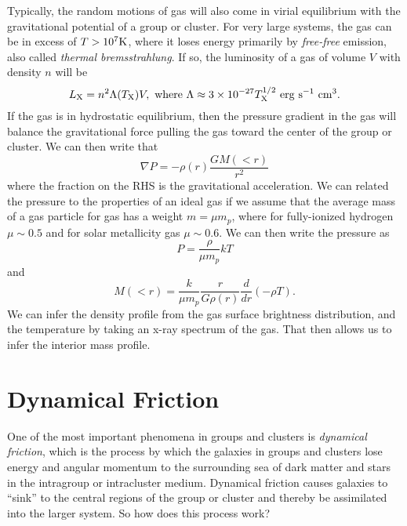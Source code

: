 \documentclass[]{article}
\begin{document}
Typically, the random motions of gas will also come in 
virial equilibrium with the gravitational potential of a
group or cluster.  For very large systems, the gas can be
in excess of $T>10^{7}\mathrm{K}$, where it loses energy primarily
by {\it free-free} emission, also called {\it thermal bremsstrahlung}.
If so, the luminosity of a gas of volume $V$ with density $n$ will be
\begin{equation}
L_{\mathrm{X}} = n^2 \Lambda(T_{\mathrm{X}}) V,~\mathrm{where}~\Lambda\approx3\times10^{-27}T_{\mathrm{X}}^{1/2}~\mathrm{erg}~\mathrm{s}^{-1}~\mathrm{cm}^{3}.
\end{equation}
\noindent
If the gas is in hydrostatic equilibrium, then
the pressure gradient in the gas will balance the gravitational
force pulling the gas toward the center of the group or cluster.
We can then write that
\begin{equation}
\nabla P = -\rho(r) \frac{GM(<r)}{r^2}
\end{equation}
\noindent
where the fraction on the RHS is the gravitational acceleration.
We can related the pressure to the properties of an ideal gas
if we assume that the average mass of a gas particle for 
gas has a weight $m = \mu m_{p}$, where for fully-ionized
hydrogen $\mu\sim0.5$ and for solar metallicity gas $\mu\sim0.6$.
We can then write the pressure as
\begin{equation}
P = \frac{\rho}{\mu m_{p}}kT
\end{equation}
\noindent
and
\begin{equation}
M(<r) = \frac{k}{\mu m_p}\frac{r}{G \rho(r)} \frac{d}{dr}(-\rho T).
\end{equation}
\noindent
We can infer the density profile from the gas surface brightness
distribution, and the temperature by taking an x-ray spectrum of the
gas.  That then allows us to infer the interior mass profile.

\section{Dynamical Friction}

One of the most important phenomena in groups and clusters is
{\it dynamical friction}, which is the process by which the
galaxies in groups and clusters lose energy and angular momentum
to the surrounding sea of dark matter and stars in the intragroup
or intracluster medium. Dynamical friction causes galaxies to ``sink''
to the central regions of the group or cluster and thereby be
assimilated into the larger system.  So how does this process work?
\end{document}
